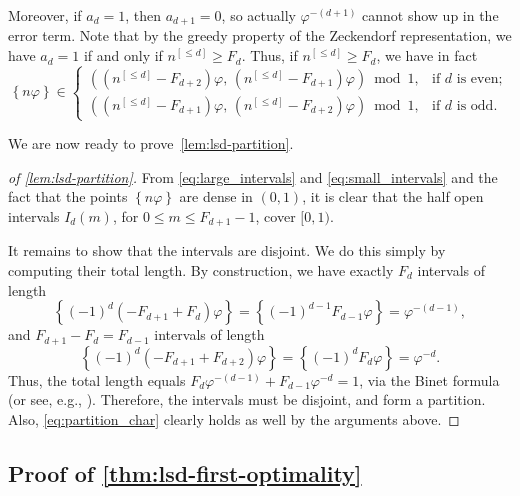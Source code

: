\documentclass[12pt,runningheads]{llncs}
\renewcommand{\phi}{\varphi}
\newcommand{\fract}[1]{\left\{ #1 \right\}}
\begin{document}
Moreover, if $a_d = 1$, then $a_{d+1} = 0$, so actually $\phi^{-(d+1)}$ cannot show up in the error term. Note that by the greedy property of the Zeckendorf representation, we have $a_d = 1$ if and only if $n^{[\leq d]}\geq F_d$. Thus, if $n^{[\leq d]}\geq F_d$, we have in fact
\begin{equation}\label{eq:small_intervals}
        \fract{n\phi} 
    \in \begin{cases}
        \left( (n^{[\leq d]} - F_{d+2})\phi, \, (n^{[\leq d]} - F_{d+1})\phi \right) \bmod 1,
        &\text{if $d$ is even};\\
        \left((n^{[\leq d]} - F_{d+1})\phi, \, (n^{[\leq d]} -F_{d+2})\phi\right) \bmod 1,
        &\text{if $d$ is odd}.
    \end{cases}
\end{equation}

We are now ready to prove~\cref{lem:lsd-partition}.

\begin{proof}[of \cref{lem:lsd-partition}]
From \eqref{eq:large_intervals} and \eqref{eq:small_intervals} and the fact that the points $\fract{n\phi}$ are dense in $(0,1)$, it is clear that the half open intervals $I_d(m)$, for $0\leq m \leq F_{d+1}-1$, cover $[0,1)$.

It remains to show that the intervals are disjoint. 
We do this simply by computing their total length.
By construction, we have exactly $F_d$ intervals of length 
\[
    \fract{(-1)^d(-F_{d+1} + F_{d})\phi} 
    = \fract{(-1)^{d-1}F_{d-1}\phi} 
    = \phi^{-(d-1)},
\]
and $F_{d+1} - F_{d} = F_{d-1}$ intervals of length 
\[
    \fract{(-1)^d(-F_{d+1} + F_{d+2})\phi} 
    = \fract{(-1)^{d} F_{d} \phi }
    = \phi^{-d}.
\]
Thus, the total length equals $F_d \phi^{-(d-1)} + F_{d-1}\phi^{-d} = 1$, via the Binet formula (or see, e.g., \cite{Knott:2021}). Therefore, the intervals must be disjoint, and form a partition. Also, \eqref{eq:partition_char} clearly holds as well by the arguments above.
\end{proof}

\subsection{Proof of \cref{thm:lsd-first-optimality}}
\end{document}

